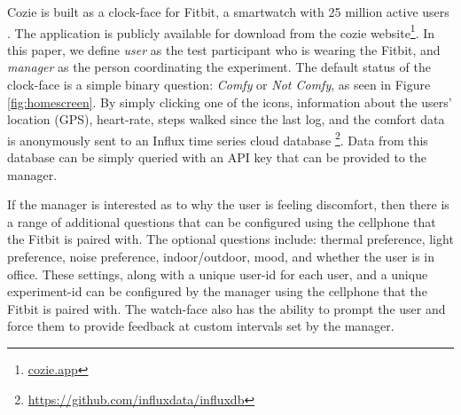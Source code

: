 
Cozie is built as a clock-face for Fitbit, a smartwatch with 25 million active users \cite{fibit2018}. The application is publicly available for download from the cozie website\footnote{\url{cozie.app}}. In this paper, we define \emph{user} as the test participant who is wearing the Fitbit, and \emph{manager} as the person coordinating the experiment. The default status of the clock-face is a simple binary question: \emph{Comfy} or \emph{Not Comfy}, as seen in Figure \ref{fig:homescreen}. By simply clicking one of the icons, information about the users' location (GPS), heart-rate, steps walked since the last log, and the comfort data is anonymously sent to an Influx time series cloud database \footnote{\url{https://github.com/influxdata/influxdb}}. Data from this database can be simply queried with an API key that can be provided to the manager. 

If the manager is interested as to why the user is feeling discomfort, then there is a range of additional questions that can be configured using the cellphone that the Fitbit is paired with. The optional questions include: thermal preference, light preference, noise preference, indoor/outdoor, mood, and whether the user is in office. These settings, along with a unique user-id for each user, and a unique experiment-id can be configured by the manager using the cellphone that the Fitbit is paired with. The watch-face also has the ability to prompt the user and force them to provide feedback at custom intervals set by the manager.



